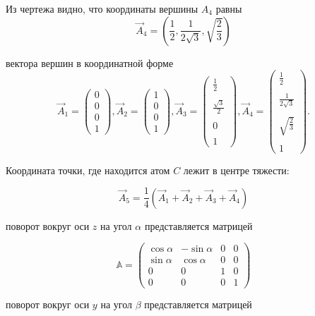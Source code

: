 \documentclass[a4paper,11pt]{article}
\begin{document}
Из чертежа %
видно, что координаты вершины $A_4$ равны
$$
\vec{A}_4 = \left({\displaystyle \frac{1}{2}}, {\displaystyle \frac{1}{2\sqrt{3}} }, {\displaystyle \sqrt{\frac{2}{3}}}\right)
$$

вектора вершин в координатной форме
$$ 
\vec{A}_1=\left(\begin{array}{c}0\\0\\0\\1\end{array}\right), 
\vec{A}_2 =\left(\begin{array}{c}1\\0\\0\\1\end{array}\right),
\vec{A}_3 =\left(\begin{array}{c}{\displaystyle \frac{1}{2}}\\ \\
{\displaystyle \frac{\sqrt{3}}{2}}\\ \\0\\ \\1\end{array}\right),
\vec{A}_4 =\left(\begin{array}{c}{\displaystyle \frac{1}{2}}\\ \\
{\displaystyle \frac{1}{2\sqrt{3}}}\\ \\
{\displaystyle \sqrt{\frac{2}{3}}}\\ \\1\end{array}\right).
$$ 

Координата точки, где находится атом $C$ лежит в центре тяжести:

$$
\vec{A}_5 = \frac{1}{4}
\left(\vec{A}_1 + \vec{A}_2 + \vec{A}_3 + \vec{A}_4\right)
$$

поворот вокруг оси $z$ на угол $\alpha$ представляется матрицей

$$
\mathds{A} = \left(\begin{array}{cccc}
\cos{\alpha}&-\sin{\alpha}&0&0\\
\sin{\alpha}&\cos{\alpha}&0&0\\
0&0&1&0\\
0&0&0&1
\end{array}\right)
$$

поворот вокруг оси $y$ на угол $\beta$ представляется матрицей
\end{document}
